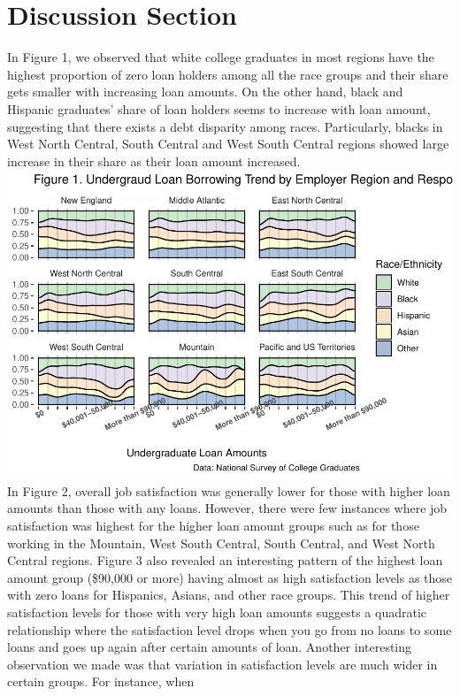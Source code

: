 \documentclass[]{article}
\begin{document}
\section{Discussion Section}\label{discussion-section}

In Figure 1, we observed that white college graduates in most regions
have the highest proportion of zero loan holders among all the race
groups and their share gets smaller with increasing loan amounts. On the
other hand, black and Hispanic graduates' share of loan holders seems to
increase with loan amount, suggesting that there exists a debt disparity
among races. Particularly, blacks in West North Central, South Central
and West South Central regions showed large increase in their share as
their loan amount increased.
\includegraphics{Report_Draft_04282019_files/figure-latex/unnamed-chunk-2-1.pdf}
In Figure 2, overall job satisfaction was generally lower for those with
higher loan amounts than those with any loans. However, there were few
instances where job satisfaction was highest for the higher loan amount
groups such as for those working in the Mountain, West South Central,
South Central, and West North Central regions. Figure 3 also revealed an
interesting pattern of the highest loan amount group (\$90,000 or more)
having almost as high satisfaction levels as those with zero loans for
Hispanics, Asians, and other race groups. This trend of higher
satisfaction levels for those with very high loan amounts suggests a
quadratic relationship where the satisfaction level drops when you go
from no loans to some loans and goes up again after certain amounts of
loan. Another interesting observation we made was that variation in
satisfaction levels are much wider in certain groups. For instance, when
\end{document}
